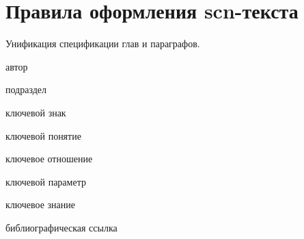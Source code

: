 \section*{Правила оформления scn-текста}

Унификация спецификации глав и параграфов.

\begin{SCn}
	
	\bigskip
	
	
	\bigskip
	
	\begin{scnrelfromlist}{автор}
	\end{scnrelfromlist}
	
	\bigskip
	
	
	\bigskip
	
	\begin{scnrelfromlist}{подраздел}
	\end{scnrelfromlist}

	\bigskip

	\begin{scnrelfromlist}{ключевой знак}
	\end{scnrelfromlist}
	
	\bigskip
	
	\begin{scnrelfromlist}{ключевой понятие}
	\end{scnrelfromlist}
	
	\bigskip
	
	\begin{scnrelfromlist}{ключевое отношение}
	\end{scnrelfromlist}
	
	\bigskip
	
	\begin{scnrelfromlist}{ключевой параметр}
	\end{scnrelfromlist}
	
	\bigskip
	
	\begin{scnrelfromlist}{ключевое знание}
	\end{scnrelfromlist}

	\bigskip
	
	\begin{scnrelfromlist}{библиографическая ссылка}
	\end{scnrelfromlist}
	
\end{SCn}

